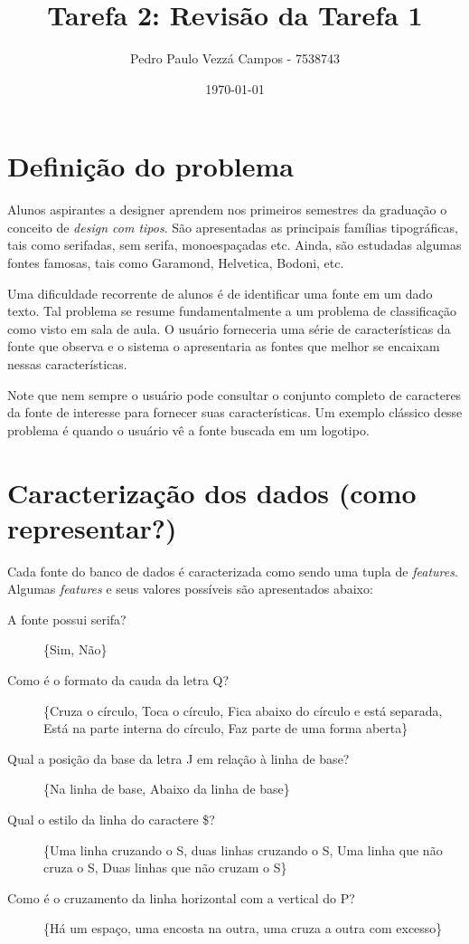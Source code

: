 \documentclass[brazil]{article}
\begin{document}
\title{Tarefa 2: Revisão da Tarefa 1}
\author{Pedro Paulo Vezzá Campos - 7538743}
\date{\today}

\maketitle



\section{Definição do problema}
Alunos aspirantes a designer aprendem nos primeiros semestres da graduação
o conceito de \emph{design com tipos}. São apresentadas as principais famílias
tipográficas, tais como serifadas, sem serifa, monoespaçadas etc. Ainda, são 
estudadas algumas fontes famosas, tais como Garamond, Helvetica, Bodoni, etc.

Uma dificuldade recorrente de alunos é de identificar uma fonte em um dado texto. 
Tal problema se resume fundamentalmente a um problema de classificação como visto
em sala de aula. O usuário forneceria uma série de características da fonte que
observa e o sistema o apresentaria as fontes que melhor se encaixam nessas
características.

Note que nem sempre o usuário pode consultar o conjunto completo de caracteres da 
fonte de interesse para fornecer suas características. Um exemplo clássico desse
problema é quando o usuário vê a fonte buscada em um logotipo.


\section{Caracterização dos dados (como representar?)}
Cada fonte do banco de dados é caracterizada como sendo uma tupla de 
\emph{features}. Algumas \emph{features} e seus valores possíveis são 
apresentados abaixo:

\begin{description}
	\item[A fonte possui serifa?] \{Sim, Não\}
	\item[Como é o formato da cauda da letra Q?] \{Cruza o círculo, 
	Toca o círculo, Fica abaixo do círculo e está separada, Está na parte interna
	do círculo, Faz parte de uma forma aberta\}
	\item[Qual a posição da base da letra J em relação à linha de base?] \{Na 
	linha de base, Abaixo da linha de base\}
	\item[Qual o estilo da linha do caractere \$?] \{Uma linha cruzando o S, duas
	linhas cruzando o S, Uma linha que não cruza o S, Duas linhas que não cruzam
	o S\}
	\item[Como é o cruzamento da linha horizontal com a vertical do P?] \{Há um 
	espaço, uma encosta na outra, uma cruza a outra com excesso\}
\end{description}
\end{document}
